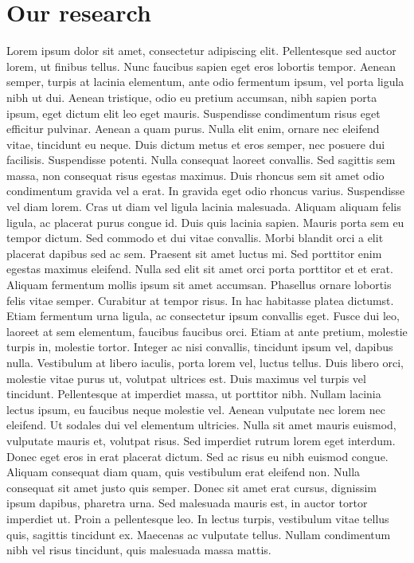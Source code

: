 \documentclass{article}
\begin{document}
\section{Our research}
Lorem ipsum dolor sit amet, consectetur adipiscing elit. Pellentesque sed auctor lorem, ut finibus tellus. Nunc faucibus sapien eget eros lobortis tempor. Aenean semper, turpis at lacinia elementum, ante odio fermentum ipsum, vel porta ligula nibh ut dui. Aenean tristique, odio eu pretium accumsan, nibh sapien porta ipsum, eget dictum elit leo eget mauris. Suspendisse condimentum risus eget efficitur pulvinar. Aenean a quam purus. Nulla elit enim, ornare nec eleifend vitae, tincidunt eu neque. Duis dictum metus et eros semper, nec posuere dui facilisis. Suspendisse potenti. Nulla consequat laoreet convallis. Sed sagittis sem massa, non consequat risus egestas maximus.
Duis rhoncus sem sit amet odio condimentum gravida vel a erat. In gravida eget odio rhoncus varius. Suspendisse vel diam lorem. Cras ut diam vel ligula lacinia malesuada. Aliquam aliquam felis ligula, ac placerat purus congue id. Duis quis lacinia sapien. Mauris porta sem eu tempor dictum. Sed commodo et dui vitae convallis. Morbi blandit orci a elit placerat dapibus sed ac sem. Praesent sit amet luctus mi. Sed porttitor enim egestas maximus eleifend. Nulla sed elit sit amet orci porta porttitor et et erat. Aliquam fermentum mollis ipsum sit amet accumsan. Phasellus ornare lobortis felis vitae semper. Curabitur at tempor risus.
In hac habitasse platea dictumst. Etiam fermentum urna ligula, ac consectetur ipsum convallis eget. Fusce dui leo, laoreet at sem elementum, faucibus faucibus orci. Etiam at ante pretium, molestie turpis in, molestie tortor. Integer ac nisi convallis, tincidunt ipsum vel, dapibus nulla. Vestibulum at libero iaculis, porta lorem vel, luctus tellus. Duis libero orci, molestie vitae purus ut, volutpat ultrices est. Duis maximus vel turpis vel tincidunt. Pellentesque at imperdiet massa, ut porttitor nibh. Nullam lacinia lectus ipsum, eu faucibus neque molestie vel. Aenean vulputate nec lorem nec eleifend. Ut sodales dui vel elementum ultricies.
Nulla sit amet mauris euismod, vulputate mauris et, volutpat risus. Sed imperdiet rutrum lorem eget interdum. Donec eget eros in erat placerat dictum. Sed ac risus eu nibh euismod congue. Aliquam consequat diam quam, quis vestibulum erat eleifend non. Nulla consequat sit amet justo quis semper. Donec sit amet erat cursus, dignissim ipsum dapibus, pharetra urna. Sed malesuada mauris est, in auctor tortor imperdiet ut. Proin a pellentesque leo. In lectus turpis, vestibulum vitae tellus quis, sagittis tincidunt ex. Maecenas ac vulputate tellus. Nullam condimentum nibh vel risus tincidunt, quis malesuada massa mattis.
\end{document}
